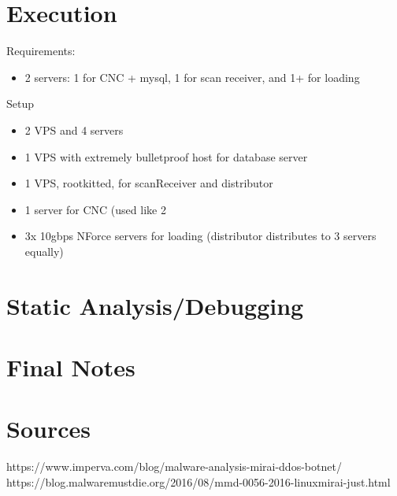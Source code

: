 \documentclass[12pt, letterpaper]{article}
\begin{document}
\begin{sloppypar}
\begin{flushleft}
\section*{Execution}

Requirements: \\
\begin{itemize}
\item 2 servers: 1 for CNC + mysql, 1 for scan receiver, and 1+ for loading
\end{itemize}

Setup
\begin{itemize}
\item 2 VPS and 4 servers
\item 1 VPS with extremely bulletproof host for database server
\item 1 VPS, rootkitted, for scanReceiver and distributor
\item 1 server for CNC (used like 2%
\item 3x 10gbps NForce servers for loading (distributor distributes to 3 servers equally)
\end{itemize}



\section*{Static Analysis/Debugging}


\section*{Final Notes}


\section*{Sources}
https://www.imperva.com/blog/malware-analysis-mirai-ddos-botnet/
https://blog.malwaremustdie.org/2016/08/mmd-0056-2016-linuxmirai-just.html

\end{flushleft}
\end{sloppypar}
\end{document}
